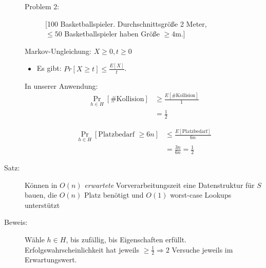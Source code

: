 \begin{description}
\begin{description}
\begin{description}
      \end{description}
  \item[Problem 2:] [100 Basketballspieler. Durchschnittsgröße 2 Meter, \\$\leq 50$ Basketballspieler haben Größe $\geq 4$m.]
 \end{description}
Markov-Ungleichung: $X \geq 0, t \geq 0$
\begin{itemize}
 \item Es gibt: $Pr[X \geq t] \leq \frac{E[X]}{t}$.
\end{itemize}
In unserer Anwendung:
\begin{align*}
\operatorname{Pr}_{h \in H}[\#\text{Kollision}] &\geq \frac{E[\#\text{Kollision}]}{1} \\
                                               &= \frac{1}{2}
\end{align*}

\begin{align*}
\operatorname{Pr}_{h \in H}[\text{Platzbedarf $\geq 6n$}] &\leq \frac{E[\text{Platzbedarf}]}{6n} \\
                                               &= \frac{3n}{6n} = \frac{1}{2}
\end{align*}
\item[Satz:] Können in $O(n)$ \emph{erwartete} Vorverarbeitungszeit eine Datenstruktur für $S$ bauen, die $O(n)$ Platz benötigt und $O(1)$ worst-case Lookups unterstützt
\item[Beweis:] Wähle $h \in H$, bis zufällig, bis Eigenschaften erfüllt. Erfolgswahrscheinlichkeit hat jeweils $\geq \frac{1}{2} \Rightarrow 2$ Versuche jeweils im Erwartungswert.
\end{description}
